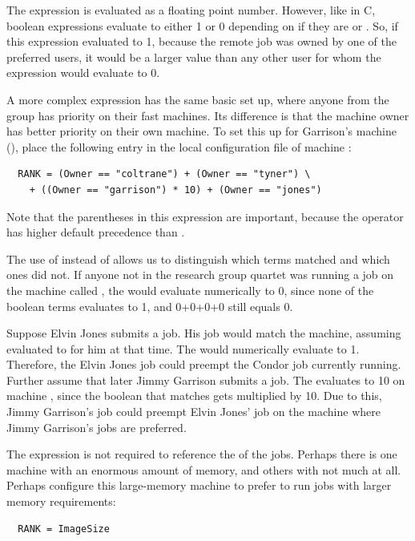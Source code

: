 The  expression is evaluated as a floating point number.
However, like in C, boolean expressions evaluate to either 1 or 0
depending on if they are  or .
So, if this expression
evaluated to 1, 
because the remote job was owned by one of the preferred users,
it would be a larger value than any other
user for whom the expression would evaluate to 0.

A more complex  expression
has the same basic set up,
where anyone from the group has priority on their fast machines.
Its difference is that
the machine owner has better priority on their own machine.
To set this up for Garrison's machine (),
place the following entry in the local configuration file 
of machine :
\begin{verbatim}
  RANK = (Owner == "coltrane") + (Owner == "tyner") \
    + ((Owner == "garrison") * 10) + (Owner == "jones")
\end{verbatim}
Note that the parentheses in this expression are important, because 
the \Expr{+} operator has higher default precedence than \Expr{==}.

The use of \Expr{+} instead of \Expr{||} allows us to 
distinguish which terms matched and which ones did not.
If anyone not in the research group quartet was running a job on
the machine called \Expr{bass},
the  would evaluate numerically to 0, since none
of the boolean terms evaluates to 1, and 0+0+0+0 still equals 0.

Suppose Elvin Jones submits a job.
His job would match the  machine,
assuming  evaluated to  for him at that time.
The \MacroNI{RANK} would numerically evaluate to 1.
Therefore, the Elvin Jones job could preempt the Condor job currently running.
Further assume that later Jimmy Garrison submits a job.
The  evaluates to 10 on machine , 
since the boolean that matches gets multiplied by 10.
Due to this, Jimmy Garrison's job could preempt Elvin Jones' job
on the \Expr{bass} machine where Jimmy Garrison's jobs are preferred.

The  expression is not required to reference the
 of the jobs.
Perhaps there is one machine with an enormous amount of memory,
and others with not much at all.
Perhaps configure this
large-memory machine to prefer to run jobs with larger memory
requirements:
\begin{verbatim}
  RANK = ImageSize
\end{verbatim}

